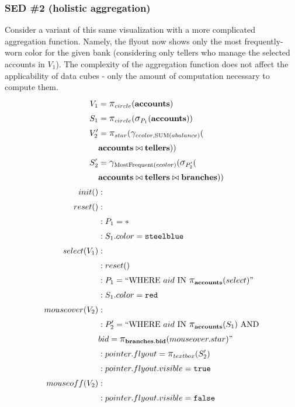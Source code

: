 \subsubsection{SED \#2 (holistic aggregation)}
Consider a variant of this same visualization with a more complicated aggregation function.
Namely, the flyout now shows only the most frequently-worn color for the given bank (considering only tellers who manage the selected accounts in $V_1$).
The complexity of the aggregation function does not affect the applicability of data cubes - only the amount of computation necessary to compute them.
\begin{align*}
	V_1&= \mathlarger{\pi}_{circle}(\bf{accounts})\\
	S_1&= \mathlarger{\pi}_{circle}(\mathlarger{\sigma}_{P_1}(\bf{accounts}))\\
	V_2'&= \mathlarger{\pi}_{star}(\mathlarger{\gamma}_{ccolor, \text{SUM}(abalance)}(\\&\bf{accounts}\bowtie{}\bf{tellers}))\\
	S_2'&= \mathlarger{\gamma}_{\text{MostFrequent}(ccolor)}(\mathlarger{\sigma}_{P_2'}(\\&\bf{accounts}\bowtie{}\bf{tellers}\bowtie{}\bf{branches}))\\
	init()&:\\
	reset()&:\\
	&: P_1 = *\\
	&: S_1.color = \texttt{steelblue}\\
	select(V_1)&:\\
	&: reset()\\
	&: P_1 = ``\text{WHERE}~aid~\text{IN}~\mathlarger{\pi}_{\bf{accounts}}(select)"\\
	&: S_1.color = \texttt{red}\\
	mouseover(V_2)&:\\
	&: P_2' = ``\text{WHERE}~aid~\text{IN}~\mathlarger{\pi}_{\bf{accounts}}(S_1)~\text{AND}\\&bid=\mathlarger{\pi}_{\bf{branches.bid}}(mouseover.star)"\\
	&: pointer.flyout = \mathlarger{\pi}_{textbox}(S_2')\\
	&: pointer.flyout.visible = \texttt{true}\\
	mouseoff(V_2)&:\\
	&: pointer.flyout.visible = \texttt{false}\\
\end{align*}
